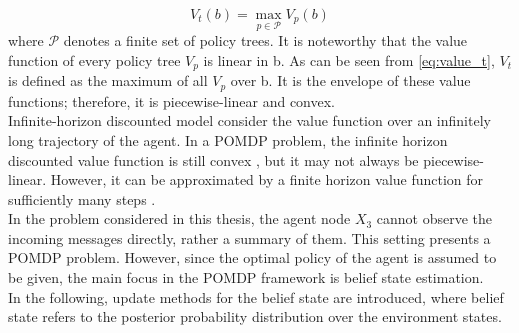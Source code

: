 \begin{equation}
V_{t}(b)=\max _{p \in \mathcal{P}} V_p(b)
\label{eq:value_t}
\end{equation}
where $ \mathcal{P} $ denotes a finite set of policy trees.
It is noteworthy that the value function of every policy tree $ V_p $ is linear in b. As can be seen from \autoref{eq:value_t}, $ V_t $ is defined as the maximum of all $ V_p $ over b. It is the envelope of these value functions; therefore, it is piecewise-linear and convex.\\
Infinite-horizon discounted model consider the value function over an infinitely long trajectory of the agent. In a POMDP problem, the infinite horizon discounted value function is still convex \cite{White1980}, but it may not always be piecewise-linear. However, it can be approximated by a finite horizon value function for sufficiently many steps \cite{Sawaki1978, Edward2019}.\\
In the problem considered in this thesis, the agent node $ X_{3} $ cannot observe the incoming messages directly, rather a summary of them. This setting presents a POMDP problem. However, since the optimal policy of the agent is assumed to be given, the main focus in the POMDP framework is belief state estimation. \\
In the following, update methods for the belief state are introduced, where belief state refers to the posterior probability distribution over the environment states.

